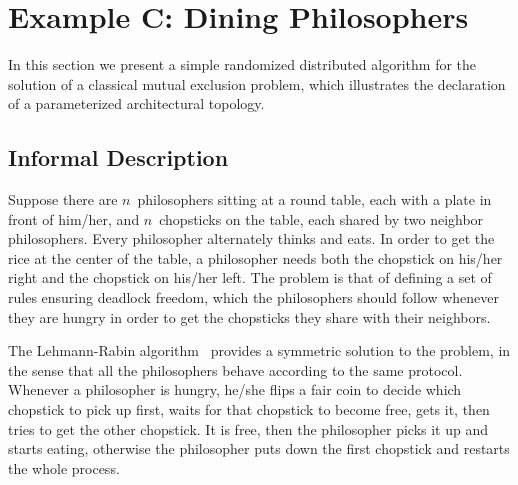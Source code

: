\section{Example C: Dining Philosophers}

In this section we present a simple randomized distributed algorithm for the solution of a classical mutual
exclusion problem, which illustrates the declaration of a parameterized architectural topology.


\subsection{Informal Description}

Suppose there are $n$~philosophers sitting at a round table, each with a plate in front of him/her, and
$n$~chopsticks on the table, each shared by two neighbor philosophers. Every philosopher alternately thinks
and eats. In order to get the rice at the center of the table, a philosopher needs both the chopstick on
his/her right and the chopstick on his/her left. The problem is that of defining a set of rules ensuring
deadlock freedom, which the philosophers should follow whenever they are hungry in order to get the
chopsticks they share with their neighbors.

The Lehmann-Rabin algorithm~\cite{LR} provides a symmetric solution to the problem, in the sense that all
the philosophers behave according to the same protocol. Whenever a philosopher is hungry, he/she flips a
fair coin to decide which chopstick to pick up first, waits for that chopstick to become free, gets it, then
tries to get the other chopstick. It is free, then the philosopher picks it up and starts eating, otherwise
the philosopher puts down the first chopstick and restarts the whole process.


